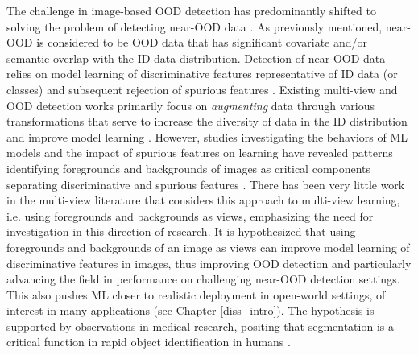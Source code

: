 The challenge in image-based OOD detection has predominantly shifted to solving the problem of detecting near-OOD data \cite{yang2022openood,winkens2020contrastive}. As previously mentioned, near-OOD is considered to be OOD data that has significant covariate and/or semantic overlap with the ID data distribution. Detection of near-OOD data relies on model learning of discriminative features representative of ID data (or classes) and subsequent rejection of spurious features \cite{ming2022impact,neuhaus2023spurious}. Existing multi-view and OOD detection works primarily focus on \emph{augmenting} data through various transformations that serve to increase the diversity of data in the ID distribution and improve model learning \cite{shorten2019survey,hendrycks2022pixmix,geng2023foreground}. However, studies investigating the behaviors of ML models and the impact of spurious features on learning have revealed patterns identifying foregrounds and backgrounds of images as critical components separating discriminative and spurious features \cite{geng2023foreground,miyai2024locoop}. There has been very little work in the multi-view literature that considers this approach to multi-view learning, i.e. using foregrounds and backgrounds as views, emphasizing the need for investigation in this direction of research. It is hypothesized that using foregrounds and backgrounds of an image as views can improve model learning of discriminative features in images, thus improving OOD detection and particularly advancing the field in performance on challenging near-OOD detection settings. This also pushes ML closer to realistic deployment in open-world settings, of interest in many applications (see Chapter \ref{diss_intro}). The hypothesis is supported by observations in medical research, positing that segmentation is a critical function in rapid object identification in humans \cite{weiner2016anatomical,vuilleumier2002multiple}.

